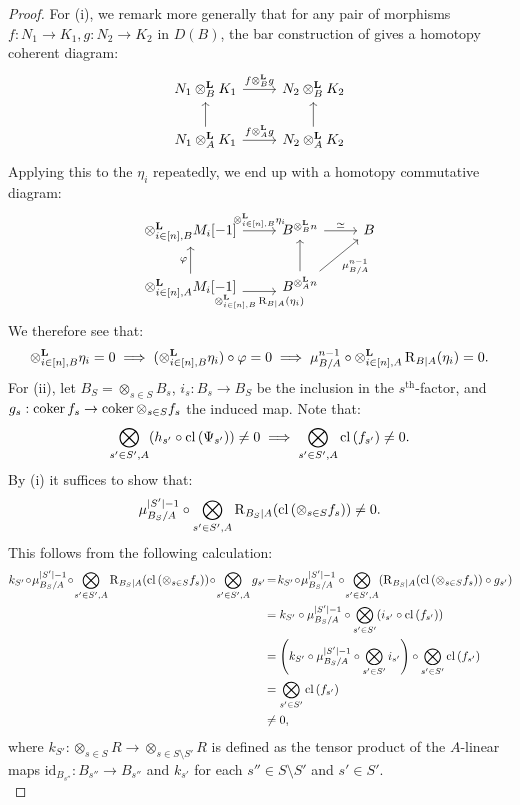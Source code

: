 \begin{proof}
For (i), we remark more generally that for any pair of morphisms $f: N_1 \to K_1, g: N_2 \to K_2$ in $D(B)$, 
the bar construction of \cite[Chapter 4.4.2]{LurieHA} gives a homotopy coherent diagram:
\[\begin{tikzcd}
N_1 \otimesl_B K_1 \arrow[r, "f \otimesl_B g"] & N_2 \otimesl_B K_2 \\
N_1 \otimesl_A K_1 \arrow[u] \arrow[r, "f \otimesl_A g"] & N_2 \otimesl_A K_2 \arrow[u]
\end{tikzcd}\]
Applying this to the $\eta_i$ repeatedly, we end up with a homotopy commutative diagram:
\[\begin{tikzcd}
\otimesl_{i\in [n], B} M_i[-1] \arrow[r, "\otimesl_{i\in [n],B} \eta_i"] & B^{\otimesl_B n} \arrow[r, "\simeq"] & B \\
\otimesl_{i\in [n], A} M_i[-1] \arrow[u, "\varphi"] \arrow[r,swap, "\otimesl_{i\in [n],B} \R_{B|A}(\eta_i)", {yshift=-3pt}] & B^{\otimesl_A n} \arrow[u] \arrow[ru, swap,"\mu^{n-1}_{B/A}"] &
\end{tikzcd}\]
We therefore see that:
\[\otimes^{\boldsymbol{\mathrm{L}}}_{i\in [n],B} \eta_i =0 \implies (\otimes^{\boldsymbol{\mathrm{L}}}_{i\in [n],B} \eta_i) \circ \varphi =0 \implies \mu^{n-1}_{B/A} \circ \otimes^{\boldsymbol{\mathrm{L}}}_{i\in [n],A} \operatorname{R}_{B|A}(\eta_i) = 0.\]
For (ii), let $B_{S} = \otimes_{s \in S} B_{s}$,  $i_s: B_s \to B_S$ be the inclusion in the $s^{\text{th}}$-factor, and $g_s: \operatorname{coker}{f_s} \rightarrow \operatorname{coker}{\otimes_{s \in S} f_s}$ the induced map. Note that:
\[\bigotimes_{s' \in S',A} (h_{s'} \circ \mathrm{cl}\left(\Psi_{s'} \right)) \neq 0 \implies \bigotimes_{s' \in S',A} \mathrm{cl}\left(f_{s'}\right) \neq 0.\]
By (i) it suffices to show that:
\[\mu^{|S'|-1}_{B_{S}/A} \circ \bigotimes_{s' \in S', A} \operatorname{R}_{B_{S}|A}(\mathrm{cl}\left(\otimes_{s \in S} f_s\right)) \neq 0.\]
This follows from the following calculation:
\begin{align*}k_{S'}\! \circ \!\mu^{|S'|-1}_{B_{S}/A} \!\circ \!\bigotimes_{s' \in S', A} \R_{B_{S}|A}(\cl{\otimes_{s \in S} f_s}) \! \circ \!\bigotimes_{s' \in S', A} g_{s'}\! &= \! k_{S'} \!\circ \! \mu^{|S'|-1}_{B_{S}/A} \circ \!\bigotimes_{s' \in S', A} (\R_{B_{S}|A}(\cl{\otimes_{s \in S} f_s}) \circ g_{s'})\!\\
& = k_{S'} \circ \mu^{|S'|-1}_{B_{S}/A} \circ \bigotimes_{s' \in S'} (i_{s'} \circ \cl{f_{s'}})\\
&= \left (k_{S'} \circ \mu^{|S'|-1}_{B_{S}/A} \circ \bigotimes_{s' \in S'} i_{s'}\right) \circ \bigotimes_{s' \in S'} \cl{f_{s'}}\\
&= \bigotimes_{s' \in S'} \cl{f_{s'}} \\
&\neq 0,
\end{align*}
where $k_{S'}: \otimes_{s \in S} R \to \otimes_{s \in S \setminus S'}R$ is defined as the tensor product of 
the $A$-linear maps $\text{id}_{B_{s''}}: B_{s''} \to B_{s''}$ and $k_{s'}$ for each $s'' \in S \setminus S'$ and $s' \in S'$. \\
\end{proof}
